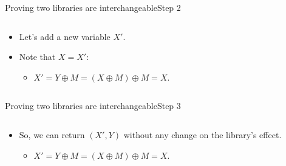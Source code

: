 \documentclass[aspectratio=169, lualatex, handout]{beamer}
\begin{document}
\begin{frame}{Proving two libraries are interchangeable}{Step 2}
	\begin{columns}[c]
		\begin{column}{0.5\textwidth}
			\begin{itemize}
				\item Let's add a new variable $X'$.
				\item Note that $X = X'$:
				      \begin{itemize}
					      \item $X' = Y \oplus M = (X \oplus M) \oplus M = X$.
				      \end{itemize}
			\end{itemize}
		\end{column}
		\begin{column}{0.5\textwidth}
			\begin{center}
			\end{center}
		\end{column}
	\end{columns}
\end{frame}

\begin{frame}{Proving two libraries are interchangeable}{Step 3}
	\begin{columns}[c]
		\begin{column}{0.5\textwidth}
			\begin{itemize}
				\item So, we can return $(X', Y)$ without any change on the library's effect.
				      \begin{itemize}
					      \item $X' = Y \oplus M = (X \oplus M) \oplus M = X$.
				      \end{itemize}
			\end{itemize}
		\end{column}
		\begin{column}{0.5\textwidth}
			\begin{center}
			\end{center}
		\end{column}
	\end{columns}
\end{frame}
\end{document}
